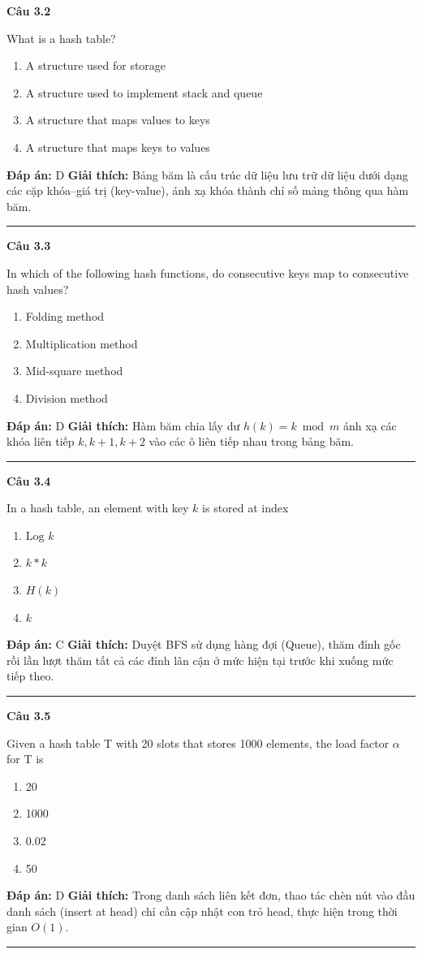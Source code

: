 \documentclass[11pt,a4paper]{article}
\newenvironment{question}[1]{%
  \par\vspace{1em}\noindent\textbf{\large Câu #1}\par\vspace{0.4em}
}{%
  \par\vspace{1em}\hrule\vspace{0.6em}
}
\newenvironment{choices}{%
  \begin{enumerate}[label=\textbf{\Alph*.},leftmargin=2.2em,itemsep=2pt,topsep=3pt]
}{%
  \end{enumerate}
}
\newcommand{\choice}{\item}
\begin{document}
\begin{question}{3.2}
What is a hash table?
\begin{choices}
\choice A structure used for storage
\choice A structure used to implement stack and queue
\choice A structure that maps values to keys
\choice A structure that maps keys to values
\end{choices}
\textbf{Đáp án:} D
\textbf{Giải thích:} Bảng băm là cấu trúc dữ liệu lưu trữ dữ liệu dưới dạng các cặp khóa--giá trị (key-value), ánh xạ khóa thành chỉ số mảng thông qua hàm băm.
\end{question}

\begin{question}{3.3}
In which of the following hash functions, do consecutive keys map to consecutive hash values?
\begin{choices}
\choice Folding method
\choice Multiplication method
\choice Mid-square method
\choice Division method
\end{choices}
\textbf{Đáp án:} D
\textbf{Giải thích:} Hàm băm chia lấy dư $h(k) = k \bmod m$ ánh xạ các khóa liên tiếp $k, k+1, k+2$ vào các ô liên tiếp nhau trong bảng băm.
\end{question}

\begin{question}{3.4}
In a hash table, an element with key $k$ is stored at index
\begin{choices}
\choice $\text{Log } k$
\choice $k * k$
\choice $H(k)$
\choice $k$
\end{choices}
\textbf{Đáp án:} C
\textbf{Giải thích:} Duyệt BFS sử dụng hàng đợi (Queue), thăm đỉnh gốc rồi lần lượt thăm tất cả các đỉnh lân cận ở mức hiện tại trước khi xuống mức tiếp theo.
\end{question}

\begin{question}{3.5}
Given a hash table T with 20 slots that stores 1000 elements, the load factor $\alpha$ for T is
\begin{choices}
\choice 20
\choice 1000
\choice 0.02
\choice 50
\end{choices}
\textbf{Đáp án:} D
\textbf{Giải thích:} Trong danh sách liên kết đơn, thao tác chèn nút vào đầu danh sách (insert at head) chỉ cần cập nhật con trỏ head, thực hiện trong thời gian $O(1)$.
\end{question}
\end{document}
